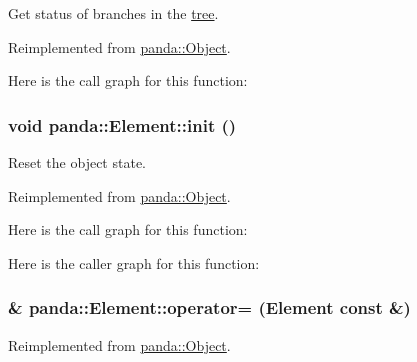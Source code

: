 Get status of branches in the \hyperlink{namespacepanda_1_1tree}{tree}. 

Reimplemented from \hyperlink{classpanda_1_1Object_ad575503e839f7aa6cc47434b3a24cb80}{panda::Object}.

Here is the call graph for this function:\hypertarget{classpanda_1_1Element_a5f48aa34efdae52533235d9703814de1}{
\subsubsection[{init}]{\setlength{\rightskip}{0pt plus 5cm}void panda::Element::init ()}}
\label{classpanda_1_1Element_a5f48aa34efdae52533235d9703814de1}


Reset the object state. 

Reimplemented from \hyperlink{classpanda_1_1Object_a204960e5f165a28176f9b4a42b9ea90c}{panda::Object}.

Here is the call graph for this function:

Here is the caller graph for this function:\hypertarget{classpanda_1_1Element_aab6953bcc5df661a05d49fca81a0a4fc}{
\subsubsection[{operator=}]{\& panda::Element::operator= ({\bf Element} const \&)}}
\label{classpanda_1_1Element_aab6953bcc5df661a05d49fca81a0a4fc}


Reimplemented from \hyperlink{classpanda_1_1Object_a083629646c455db50ea99b994aac3b7b}{panda::Object}.

